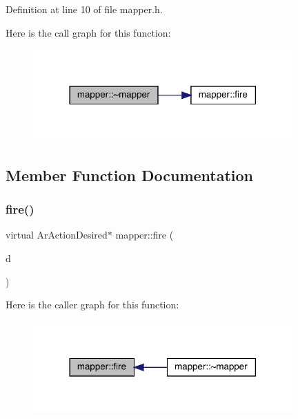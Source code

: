 Definition at line 10 of file mapper.\+h.

Here is the call graph for this function\+:\nopagebreak
\begin{figure}[H]
\begin{center}
\leavevmode
\includegraphics[width=282pt]{classmapper_aab426a3eb8681cf2c1137f658a6802a4_cgraph}
\end{center}
\end{figure}


\subsection{Member Function Documentation}
\mbox{\label{classmapper_a9d8bd0abf6844385c45d8b3ccd7b8e87}} 
\subsubsection{\texorpdfstring{fire()}{fire()}}
{\footnotesize\ttfamily virtual Ar\+Action\+Desired$\ast$ mapper\+::fire (\begin{DoxyParamCaption}\item[{Ar\+Action\+Desired}]{d }\end{DoxyParamCaption})\hspace{0.3cm}{\ttfamily [virtual]}}

Here is the caller graph for this function\+:\nopagebreak
\begin{figure}[H]
\begin{center}
\leavevmode
\includegraphics[width=282pt]{classmapper_a9d8bd0abf6844385c45d8b3ccd7b8e87_icgraph}
\end{center}
\end{figure}


